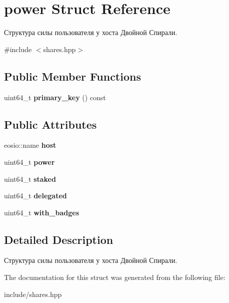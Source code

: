 \hypertarget{structpower}{}\section{power Struct Reference}
\label{structpower}


Структура силы пользователя у хоста Двойной Спирали.  




{\ttfamily \#include $<$shares.\+hpp$>$}

\subsection*{Public Member Functions}
\begin{DoxyCompactItemize}
\item 
\mbox{\label{structpower_a861dcae256146b2b675f9eaf7c76556e}} 
uint64\+\_\+t {\bfseries primary\+\_\+key} () const
\end{DoxyCompactItemize}
\subsection*{Public Attributes}
\begin{DoxyCompactItemize}
\item 
\mbox{\label{structpower_ab77f28af76fdd70f9b74eeed48d54870}} 
eosio\+::name {\bfseries host}
\item 
\mbox{\label{structpower_ae3806eb0de73dd7ad6d7aea781238236}} 
uint64\+\_\+t {\bfseries power}
\item 
\mbox{\label{structpower_afc77ca7b22e5a62402eada2a2b237b96}} 
uint64\+\_\+t {\bfseries staked}
\item 
\mbox{\label{structpower_a29ae18db4785b901524f580bc470914c}} 
uint64\+\_\+t {\bfseries delegated}
\item 
\mbox{\label{structpower_a01f487ee3cc0de104701ae9bd3a5549f}} 
uint64\+\_\+t {\bfseries with\+\_\+badges}
\end{DoxyCompactItemize}


\subsection{Detailed Description}
Структура силы пользователя у хоста Двойной Спирали. 

The documentation for this struct was generated from the following file\+:\begin{DoxyCompactItemize}
\item 
include/shares.\+hpp\end{DoxyCompactItemize}
